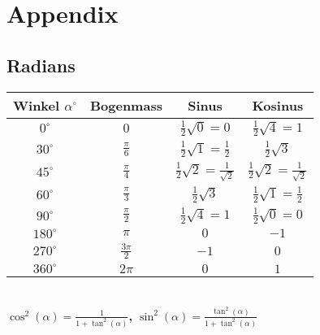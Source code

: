 \section{Appendix}

\subsection{Radians}

\begin{tabular}{cccc}
    Winkel $\alpha^\circ$ & Bogenmass & Sinus & Kosinus \\ [1.5ex] \hline
    $0^\circ$ & $0$ & $\frac{1}{2}\sqrt{0} = 0$ & $\frac{1}{2}\sqrt{4} = 1$ \\ [1.5ex] \hline
    $30^\circ$ & $\frac{\pi}{6}$ & $\frac{1}{2} \sqrt{1} = \frac{1}{2}$ & $\frac{1}{2} \sqrt{3}$ \\ [1.5ex] \hline
    $45^\circ$ & $\frac{\pi}{4}$ & $\frac{1}{2}\sqrt{2} = \frac{1}{\sqrt{2}}$ & $\frac{1}{2}\sqrt{2} = \frac{1}{\sqrt{2}}$ \\ [1.5ex] \hline
    $60^\circ$ & $\frac{\pi}{3}$ & $\frac{1}{2}\sqrt{3}$ & $\frac{1}{2}\sqrt{1} = \frac{1}{2}$ \\ [1.5ex] \hline
    $90^\circ$ & $\frac{\pi}{2}$ & $\frac{1}{2}\sqrt{4} = 1$ & $\frac{1}{2} \sqrt{0} = 0$ \\ [1.5ex] \hline
    $180^\circ$ & $\pi$ & $0$ & $-1$ \\ [1.5ex] \hline
    $270^\circ$ & $\frac{3\pi}{2}$ & $-1$ & $0$ \\ [1.5ex] \hline
    $360^\circ$ & $2\pi$ & $0$ & $1$ \\ [1.5ex] \hline
\end{tabular} \\

\textbf{$\cos^2(\alpha) = \frac{1}{1 + \tan^2(\alpha)}$, $\sin^2(\alpha) = \frac{\tan^2(\alpha)}{1 + \tan^2(\alpha)}$}
